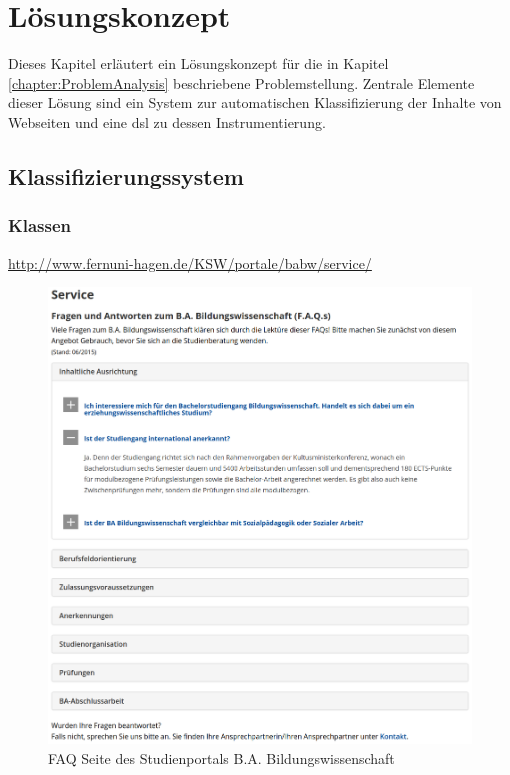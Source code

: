 \chapter{Lösungskonzept}
    \label{chapter:SolutionConcept}
    Dieses Kapitel erläutert ein Lösungskonzept für die in Kapitel \ref{chapter:ProblemAnalysis} beschriebene Problemstellung.
    Zentrale Elemente dieser Lösung sind ein System zur automatischen Klassifizierung der Inhalte von Webseiten
    und eine \gls{dsl} zu dessen Instrumentierung.

    \section{Klassifizierungssystem}
        \subsection{Klassen}
            \url{http://www.fernuni-hagen.de/KSW/portale/babw/service/}

            \begin{figure}
                \centering
                \includegraphics[width=\textwidth]{../resources/babw_service_faq.png}
                \caption{FAQ Seite des Studienportals B.A. Bildungswissenschaft}
                \label{image:BuildingBlocks}
            \end{figure}